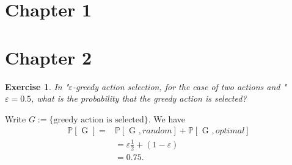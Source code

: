 \documentclass[answers]{exam}
\newtheorem{exercise}[theorem]{Exercise}
\theoremstyle{definition}
\theoremstyle{remark}
\newcommand{\Proba}[1]{\mathbb{P}\left[#1\right]}
\newcommand{\e}{\varepsilon}
\begin{document}
\section{Chapter 1}

\section{Chapter 2}


\begin{exercise}
In "$\e$-greedy action selection, for the case of two actions and " $\e= 0.5$, what is
the probability that the greedy action is selected?
\end{exercise}
\begin{solution}
Write $G:=\{\text{greedy action is selected}\}$. We have
\begin{align*}
\Proba{\text{ G }}=&\Proba{\text{ G },random}+\Proba{\text{ G },optimal}    \\
&=\e\frac{1}{2}+(1-\e)\\
&=0.75.
\end{align*}  
\end{solution}
\end{document}
